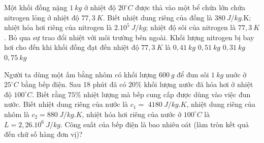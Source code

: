 \begin{ex} 
	Một khối đồng nặng $1 \ kg$ ở nhiệt độ $20^\circ C$ được thả vào một bể chứa lớn chứa nitrogen lỏng ở nhiệt độ $77,3 \ K$. Biết nhiệt dung riêng của đồng là $380 \ J /kg$.K; nhiệt hóa hơi riêng của nitrogen là $2 . 10^{5} \ J /kg$; nhiệt độ sôi của nitrogen là $77,3\ K$. Bỏ qua sự trao đổi nhiệt với môi trường bên ngoài. Khối lượng nitrogen bị bay hơi cho đến khi khối đồng đạt đến nhiệt độ $77,3 \ K$ là
	\choice
	{\True $0,41 \ kg$}
	{$0,51 \ kg$}
	{$0,31 \ kg$}
	{$0,75 \ kg$}
\end{ex}
\begin{ex} 
Người ta dùng một ấm bằng nhôm có khối lượng $600 \ g$ để đun sôi $1 \ kg$ nuớc ở $25^\circ C$ bằng bếp điện. Sau 18 phút đã có $20 \%$ khối lượng nước đã hóa hơi ở nhiệt độ $100^\circ C$. Biết rằng $75\%$ nhiệt lượng mà bếp cung cấp được dùng vào việc đun nước. Biết nhiệt dung riêng của nước là $c_1=$ $4180 \ J/kg. K$, nhiệt dung riêng của nhôm là $c_2=880 \ J / kg . K$, nhiệt hóa hơi riêng của nước ở $100^\circ C$ là $L=2,26.10^{6} \ J/kg$. Công suất của bếp điện là bao nhiêu oát (làm tròn kết quả đến chữ số hàng đơn vị)?
\end{ex}

